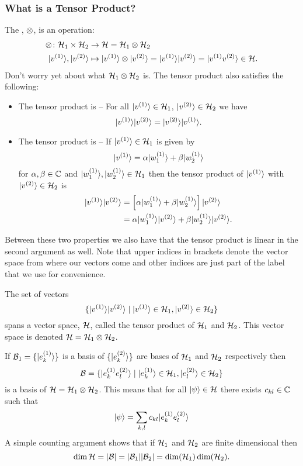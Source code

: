     \subsubsection{What is a Tensor Product?}
    The , \(\otimes\), is an operation:
    \begin{align*}
        \otimes\colon\mathcal{H}_1\times\mathcal{H}_2&\to\mathcal{H} = \mathcal{H}_1\otimes\mathcal{H}_2\\
        \vert {v^{(1)}} \rangle, \vert {v^{(2)}} \rangle&\mapsto\vert {v^{(1)}} \rangle\otimes\vert {v^{(2)}} \rangle = \vert {v^{(1)}} \rangle\vert {v^{(2)}} \rangle = \vert {v^{(1)}v^{(2)}} \rangle \in\mathcal{H}.
    \end{align*}
    Don't worry yet about what \(\mathcal{H}_1\otimes\mathcal{H}_2\) is.
    The tensor product also satisfies the following:
    \begin{itemize}
        \item The tensor product is  -- For all \(\vert {v^{(1)}} \rangle\in\mathcal{H}_1\), \(\vert {v^{(2)}} \rangle\in\mathcal{H}_2\) we have
        \[\vert {v^{(1)}} \rangle\vert {v^{(2)}} \rangle = \vert {v^{(2)}} \rangle\vert {v^{(1)}} \rangle.\]
        \item The tensor product is  -- If \(\vert {v^{(1)}} \rangle\in\mathcal{H}_1\) is given by
        \[\vert {v^{(1)}} \rangle = \alpha\vert {w_1^{(1)}} \rangle + \beta\vert {w_2^{(1)}} \rangle\]
        for \(\alpha, \beta\in\mathbb{C}\) and \(\vert {w_1^{(1)}} \rangle, \vert {w_2^{(1)}} \rangle\in\mathcal{H}_1\) then the tensor product of \(\vert {v^{(1)}} \rangle\) with \(\vert {v^{(2)}} \rangle\in\mathcal{H}_2\) is
        \begin{align*}
            \vert {v^{(1)}} \rangle\vert {v^{(2)}} \rangle &= \left[\alpha\vert {w_1^{(1)}} \rangle + \beta\vert {w_2^{(1)}} \rangle\right]\vert {v^{(2)}} \rangle\\
            &= \alpha\vert {w_1^{(1)}} \rangle\vert {v^{(2)}} \rangle + \beta\vert {w_2^{(1)}} \rangle\vert {v^{(2)}} \rangle.
        \end{align*}
    \end{itemize}
    Between these two properties we also have that the tensor product is linear in the second argument as well.
    Note that upper indices in brackets denote the vector space from where our vectors come and other indices are just part of the label that we use for convenience.
    
    The set of vectors
    \[\{\vert {v^{(1)}} \rangle\vert {v^{(2)}} \rangle\mid\vert {v^{(1)}} \rangle\in\mathcal{H}_1, \vert {v^{(2)}} \rangle\in\mathcal{H}_2\}\]
    spans a vector space, \(\mathcal{H}\), called the tensor product of \(\mathcal{H}_1\) and \(\mathcal{H}_2\).
    This vector space is denoted \(\mathcal{H} = \mathcal{H}_1\otimes\mathcal{H}_2\).
    
    If \(\mathcal{B}_1 = \{\vert {e_k^{(1)}} \rangle\}\) is a basis of \(\{\vert {e_k^{(2)}} \rangle\}\) are bases of \(\mathcal{H}_1\) and \(\mathcal{H}_2\) respectively then
    \[\mathcal{B} = \{\vert {e_k^{(1)}e_l^{(2)}} \rangle\mid \vert {e_k^{(1)}} \rangle\in\mathcal{H}_1, \vert {e_l^{(2)}} \rangle\in\mathcal{H}_2\}\]
    is a basis of \(\mathcal{H} = \mathcal{H}_1\otimes\mathcal{H}_2\).
    This means that for all \(\vert {\psi} \rangle\in\mathcal{H}\) there exists \(c_{kl}\in\mathbb{C}\) such that
    \[\vert {\psi} \rangle = \sum_{k, l}c_{kl}\vert {e_k^{(1)}e_l^{(2)}} \rangle\]
    A simple counting argument shows that if \(\mathcal{H}_1\) and \(\mathcal{H}_2\) are finite dimensional then
    \[\dim\mathcal{H} = \abs{\mathcal{B}} = \abs{\mathcal{B}_1}\abs{\mathcal{B}_2} = \dim(\mathcal{H}_1)\dim(\mathcal{H}_2).\]
    
